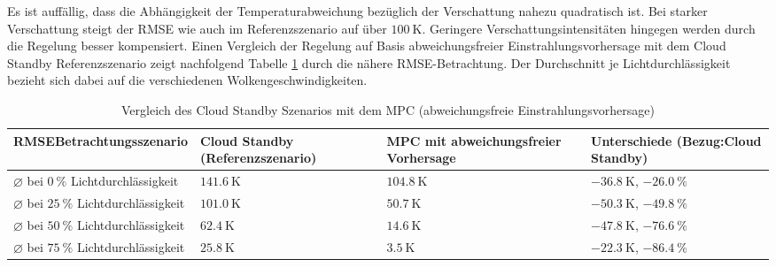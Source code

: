 Es ist auffällig, dass die Abhängigkeit der Temperaturabweichung bezüglich der Verschattung nahezu quadratisch ist.
Bei starker Verschattung steigt der RMSE wie auch im Referenzszenario auf über $\SI{100}{\kelvin}$.
Geringere Verschattungsintensitäten hingegen werden durch die Regelung besser kompensiert.
Einen Vergleich der Regelung auf Basis abweichungsfreier Einstrahlungsvorhersage mit dem Cloud Standby Referenzszenario zeigt nachfolgend Tabelle \ref{tab_Vergleich1} durch die nähere RMSE-Betrachtung.
Der Durchschnitt je Lichtdurchlässigkeit bezieht sich dabei auf die verschiedenen Wolkengeschwindigkeiten.

\begingroup
\renewcommand{\arraystretch}{1.2}
\begin{table}[ht!]
    \caption[Vergleich des Cloud Standby Szenarios mit dem MPC (abweichungsfreie Einstrahlungsvorhersage)]{Vergleich des Cloud Standby Szenarios mit dem MPC (abweichungsfreie Einstrahlungsvorhersage)}
    \centering
    \begin{tabular}{>{\centering\arraybackslash}m{}>{\centering\arraybackslash}m{}>{\centering\arraybackslash}m{}>{\centering\arraybackslash}m{}}
        \rowcolor{white}
        \toprule
        RMSE\linebreak Betrachtungsszenario                      & Cloud Standby (Referenzszenario) & MPC mit abweichungsfreier Vorhersage & Unterschiede (Bezug:\linebreak Cloud Standby) \\
        \midrule
        $\diameter$ bei $\SI{0}{\percent}$ Lichtdurchlässigkeit  & $\SI{141.6}{\kelvin}$            & $\SI{104.8}{\kelvin}$                & $\SI{-36.8}{\kelvin}$, $\SI{-26.0}{\percent}$ \\
        $\diameter$ bei $\SI{25}{\percent}$ Lichtdurchlässigkeit & $\SI{101.0}{\kelvin}$            & $\SI{50.7}{\kelvin}$                 & $\SI{-50.3}{\kelvin}$, $\SI{-49.8}{\percent}$ \\
        $\diameter$ bei $\SI{50}{\percent}$ Lichtdurchlässigkeit & $\SI{62.4}{\kelvin}$             & $\SI{14.6}{\kelvin}$                 & $\SI{-47.8}{\kelvin}$, $\SI{-76.6}{\percent}$ \\
        $\diameter$ bei $\SI{75}{\percent}$ Lichtdurchlässigkeit & $\SI{25.8}{\kelvin}$             & $\SI{3.5}{\kelvin}$                  & $\SI{-22.3}{\kelvin}$, $\SI{-86.4}{\percent}$ \\
        \toprule
    \end{tabular}
    \label{tab_Vergleich1}
\end{table}
\endgroup

